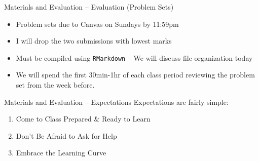 \documentclass[
  ignorenonframetext,
]{beamer}
\providecommand{\tightlist}{%
  \setlength{\itemsep}{0pt}\setlength{\parskip}{0pt}}
\begin{document}
\begin{frame}{Materials and Evaluation -- Evaluation (Problem Sets)}
\label{materials-and-evaluation-evaluation-problem-sets}
\begin{itemize}
\tightlist
\item
  Problem sets due to Canvas on Sundays by 11:59pm

  \par \vspace{1.5mm}
\item
  I will drop the two submissions with lowest marks

  \par \vspace{1.5mm}
\item
  Must be compiled using \texttt{RMarkdown} -- We will discuss file
  organization today

  \par \vspace{1.5mm}
\item
  We will spend the first 30min-1hr of each class period reviewing the
  problem set from the week before.
\end{itemize}
\end{frame}

\begin{frame}{Materials and Evaluation -- Expectations}
\label{materials-and-evaluation-expectations}
Expectations are fairly simple:

\par \vspace{5mm}

\begin{enumerate}

\item Come to Class Prepared \& Ready to Learn  \par \vspace{2.5mm}

\item Don't Be Afraid to Ask for Help  \par \vspace{2.5mm}

\item Embrace the Learning Curve


\end{enumerate}
\end{frame}
\end{document}
